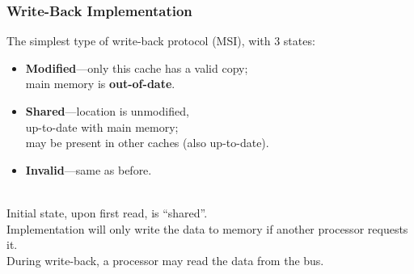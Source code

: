 \documentclass[aspectratio=43]{beamer}
\newenvironment{changemargin}[1]{%
  \begin{list}{}{%
    \setlength{\topsep}{0pt}%
    \setlength{\leftmargin}{#1}%
    \setlength{\rightmargin}{1em}
    \setlength{\listparindent}{\parindent}%
    \setlength{\itemindent}{\parindent}%
    \setlength{\parsep}{\parskip}%
  }%
  \item[]}{\end{list}}
\begin{document}
\begin{frame}
  \frametitle{Write-Back Implementation}

  \begin{changemargin}{1cm}
     The simplest type of write-back protocol (MSI), with 3 states:
      \begin{itemize}
        \item {\bf Modified}---only this cache has a valid copy; \\
          \quad main memory is {\bf out-of-date}.
        \item {\bf Shared}---location is unmodified, \\
          \quad up-to-date with main
          memory; \\
          \quad may be present in other caches (also up-to-date).
        \item {\bf Invalid}---same as before.
      \end{itemize}~\\
      
     Initial state, upon first read, is ``shared''.\\[1em]

     Implementation will only write the data to memory if another
        processor requests it.\\[1em]

     During write-back, a processor may read the data from the bus.
  \end{changemargin}
\end{frame}
\end{document}
